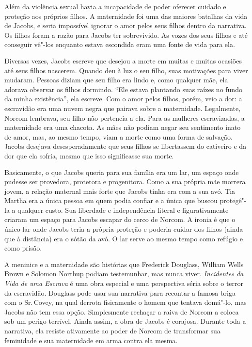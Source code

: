 Além da violência sexual havia a incapacidade de poder oferecer cuidado
e proteção aos próprios filhos. A maternidade foi uma das maiores
batalhas da vida de Jacobs, e seria impossível ignorar o amor pelos seus
filhos dentro da narrativa. Os filhos foram a razão para Jacobs ter
sobrevivido. As vozes dos seus filhos e até conseguir
vê"-los enquanto estava escondida eram uma fonte de vida para ela.

Diversas vezes, Jacobs escreve que desejou a morte em muitas e muitas
ocasiões até seus filhos nascerem. Quando deu à luz o seu filho,
suas motivações para viver mudaram. Pessoas diziam que seu filho era
lindo e, como qualquer mãe, ela adorava observar os filhos dormindo. ``Ele
estava plantando suas raízes no fundo da minha existência'', ela
escreve. Com o amor pelos filhos, porém, veio a dor: a escravidão era uma nuvem
negra que pairava sobre a maternidade. Legalmente, Norcom lembrava, seu
filho não pertencia a ela. Para as mulheres escravizadas, a maternidade
era uma chacota. As mães não podiam negar seu sentimento inato de amor,
mas, ao mesmo tempo, viam a morte como uma forma de salvação. Jacobs
desejava desesperadamente que seus filhos se libertassem do cativeiro e
da dor que ela sofria, mesmo que isso significasse sua morte.

Basicamente, o que Jacobs queria para sua família era um lar, um espaço
onde pudesse ser provedora, protetora e progenitora. Como a sua própria
mãe morrera jovem, a relação maternal mais forte que Jacobs tinha era
com a sua avó. Tia Martha era a única pessoa em quem podia confiar e a
única que buscou protegê"-la a qualquer custo. Sua liberdade e
independência literal e figurativamente criaram um espaço para Jacobs
escapar do cerco de Norcom. A ironia é que o único lar onde Jacobs teria
a própria proteção e poderia cuidar dos filhos (ainda que à distância)
era o sótão da avó. O lar serve ao mesmo tempo como refúgio e como
prisão.

A meninice e a maternidade são histórias que Frederick Douglass, William
Wells Brown e Solomon Northup podiam testemunhar, mas nunca viver.
\emph{Incidentes da Vida de uma Escrava} é uma obra especial e uma
perspectiva séria sobre o terror da escravidão. Douglass pode usar sua
narrativa para recontar a famosa briga com o Sr.\,Covey, na qual derrota
fisicamente o homem que tentava domá"-lo, mas Jacobs não tem essa opção.
Simplesmente rechaçar a raiva de Norcom a coloca sob um perigo terrível.
Ainda assim, a obra de Jacobs é corajosa. Durante toda a narrativa, ela
resiste ativamente ao poder de Norcom de transformar sua feminidade e
sua maternidade em arma contra ela mesma.

